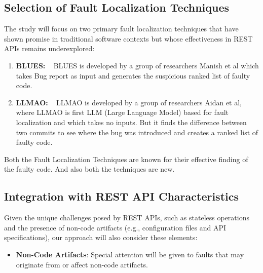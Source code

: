 \documentclass[conference]{IEEEtran}
\begin{document}
\subsection{Selection of Fault Localization Techniques}

The study will focus on two primary fault localization techniques that have shown promise in traditional software contexts but whose effectiveness in REST APIs remains underexplored:
\begin{enumerate}
    \item \textbf{BLUES:} ~\cite{ManishBluesFaultLocalization} BLUES is developed by a group of researchers Manish et al which takes Bug report as input and generates the suspicious ranked list of faulty code.
    \item \textbf{LLMAO:} ~\cite{LLMAOFaultLocalization} LLMAO is developed by a group of researchers Aidan et al, where LLMAO is first LLM (Large Language Model) based for fault localization and which takes no inputs. But it finds the difference between two commits to see where the bug was introduced and creates a ranked list of faulty code. 

\end{enumerate}

Both the Fault Localization Techniques are known for their effective finding of the faulty code. And also both the techniques are new.

\subsection{Integration with REST API Characteristics}

Given the unique challenges posed by REST APIs, such as stateless operations and the presence of non-code artifacts (e.g., configuration files and API specifications), our approach will also consider these elements:
\begin{itemize}
    \item \textbf{Non-Code Artifacts}: Special attention will be given to faults that may originate from or affect non-code artifacts. 
\end{itemize}
\end{document}
